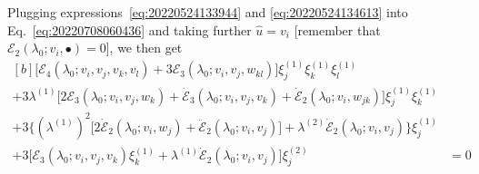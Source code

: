 \documentclass[12pt, final]{scrartcl}
\theoremstyle{definition}
\newcommand{\E}{\mathcal E}
\newcommand{\order}[2][1]{#2^{(#1)}}
\begin{document}
Plugging expressions~\eqref{eq:20220524133944} and \eqref{eq:20220524134613}
into Eq.~\eqref{eq:20220708060436} and taking further $\hat{u} = v_i$
[remember that $\E_2(\lambda_0; v_i, •) = 0$], we then get
\begin{equation*}
  \begin{aligned}[b]
    \bigl[\E_4(\lambda_0; v_i, v_j, v_k, v_l) + 3\E_3(\lambda_0; v_i, v_j, w_{kl})\bigr] \order[1]{ξ_j} \order[1]{ξ_k} \order[1]{ξ_l}&\\
    + 3\order[1]\lambda \bigl[2\E_3(\lambda_0; v_i, v_j, w_k) + \dot{\E}_3(\lambda_0; v_i, v_j, v_k) + \dot{\E}_2(\lambda_0; v_i, w_{jk}) \bigr] \order[1]{ξ_j} \order[1]{ξ_k}&\\
    + 3 \bigl\{ ( \order[1]\lambda )^2 \bigl[ 2 \dot{\E}_2(\lambda_0; v_i, w_j) + \ddot{\E}_2(\lambda_0; v_i, v_j) \bigr] + \order[2]\lambda \dot{\E}_2(\lambda_0; v_i, v_j) \bigr\}\order[1]{ξ_j}&\\
    + 3\bigl[\E_3(\lambda_0; v_i, v_j, v_k) \order[1]{ξ_k} + \order[1]\lambda \dot{\E}_2(\lambda_0; v_i, v_j)\bigr] \order[2]{ξ_j} &= 0
  \end{aligned}
\end{equation*}
\end{document}
